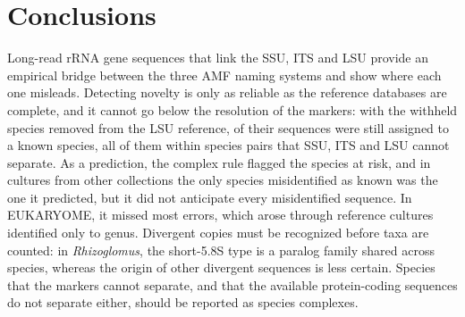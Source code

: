 \documentclass[11pt]{article}
\newcommand{\spn}[1]{\emph{#1}}   %
\begin{document}
\section{Conclusions}
Long-read rRNA gene sequences that link the SSU, ITS and LSU provide an empirical bridge between the three AMF naming
systems and show where each one misleads. Detecting novelty is only as reliable as the reference databases are
complete, and it cannot go below the resolution of the markers: with the withheld species removed from the LSU
reference, \MfourFKvTwoPct{} of their sequences were still assigned to a known species, all of them within species
pairs that SSU, ITS and LSU cannot separate. As a prediction, the complex rule flagged the species at risk, and in
cultures from other collections the only species misidentified as known was the one it predicted, but it did not
anticipate every misidentified sequence. In EUKARYOME, it missed most errors, which arose through reference cultures
identified only to genus. Divergent copies must be recognized before taxa are counted: in
\spn{Rhizoglomus}, the short-5.8S type is a paralog family shared across species, whereas the origin of other
divergent sequences is less certain. Species that the markers cannot separate, and that the available protein-coding
sequences do not separate either, should be reported as species complexes.
\end{document}
